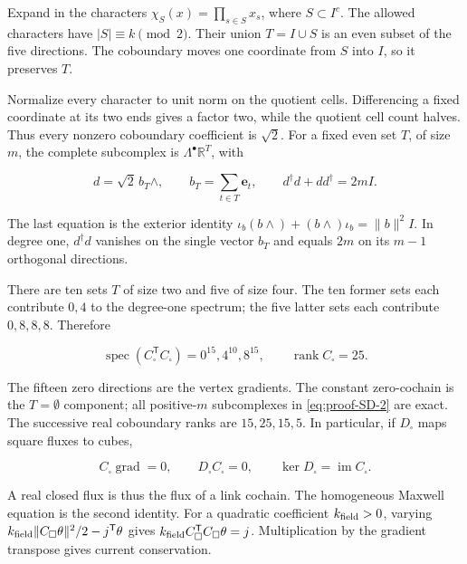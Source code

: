 \documentclass[aps,prx,onecolumn,10pt,notitlepage,nofootinbib,longbibliography]{revtex4-2}
\numberwithin{equation}{section}
\numberwithin{table}{section}
\begin{document}
Expand in the characters \(\chi_S(x)=\prod_{s\in S}x_s\), where \(S\subset I^c\). The allowed characters have \(|S|\equiv k\pmod2\). Their union \(T=I\cup S\) is an even subset of the five directions. The coboundary moves one coordinate from \(S\) into \(I\), so it preserves \(T\).

Normalize every character to unit norm on the quotient cells. Differencing a fixed coordinate at its two ends gives a factor two, while the quotient cell count halves. Thus every nonzero coboundary coefficient is \(\sqrt2\). For a fixed even set \(T\), of size \(m\), the complete subcomplex is \(\Lambda^\bullet\mathbb R^T\), with

\begin{equation}
 d=\sqrt2\,b_T\wedge,
 \qquad b_T=\sum_{t\in T}\mathbf e_t,
 \qquad d^\dagger d+dd^\dagger=2mI.
 \label{eq:proof-SD-2}
\end{equation}

The last equation is the exterior identity \(\iota_b(b\wedge)+(b\wedge)\iota_b=\|b\|^2I\). In degree one, \(d^\dagger d\) vanishes on the single vector \(b_T\) and equals \(2m\) on its \(m-1\) orthogonal directions.

There are ten sets \(T\) of size two and five of size four. The ten former sets each contribute \(0,4\) to the degree-one spectrum; the five latter sets each contribute \(0,8,8,8\). Therefore

\begin{equation}
 \operatorname{spec}(C_\square^{\mathsf T}C_\square)
       =0^{15},4^{10},8^{15},\qquad \operatorname{rank}C_\square=25.
 \label{eq:proof-SD-3}
\end{equation}

The fifteen zero directions are the vertex gradients. The constant zero-cochain is the \(T=\emptyset\) component; all positive-\(m\) subcomplexes in \eqref{eq:proof-SD-2} are exact. The successive real coboundary ranks are \(15,25,15,5\). In particular, if \(D_\square\) maps square fluxes to cubes,

\begin{equation}
 C_\square\operatorname{grad}=0,\qquad
 D_\square C_\square=0,\qquad
 \ker D_\square=\operatorname{im}C_\square.
 \label{eq:proof-SD-4}
\end{equation}

A real closed flux is thus the flux of a link cochain. The homogeneous Maxwell equation is the second identity. For a quadratic coefficient $k_{\rm field}>0$, varying $k_{\rm field}\|C_\square\theta\|^2/2-j^{\mathsf T}\theta$ gives $k_{\rm field}C_\square^{\mathsf T}C_\square\theta=j$. Multiplication by the gradient transpose gives current conservation.
\end{document}
